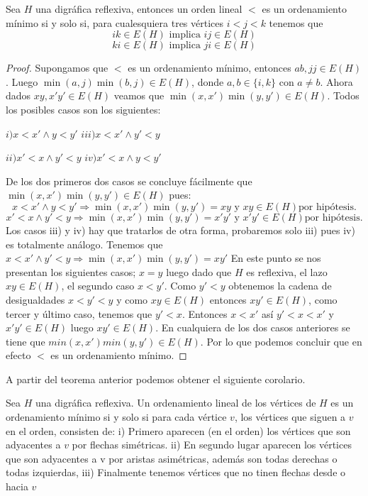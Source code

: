 \begin{teorema}
\label{teo:OrdLnl}
    Sea $H$ una digráfica reflexiva, entonces un orden lineal $<$ es un ordenamiento m\'inimo si y solo si, para cualesquiera tres vértices $i<j<k$ tenemos que 
    $$ik\in E(H) \text{ implica } ij\in E(H)$$
    $$ki\in E(H) \text{ implica } ji\in E(H)$$
\end{teorema}
\begin{proof}
    Supongamos que $<$ es un ordenamiento m\'inimo, entonces $ab,jj\in E(H)$. Luego $\min(a,j) \min(b,j)\in E(H)$, donde $a,b \in \{ i,k\}$ con $a \neq b$.
    Ahora dados $xy, x'y' \in E(H)$ veamos que $\min(x,x') \min(y,y')\in E(H)$. Todos los posibles casos son los siguientes:
    
    $ i) x<x' \wedge y<y' $ \hspace{1cm} $iii) x<x' \wedge y'<y $
    
    $ ii) x'<x \wedge y'<y $ \hspace{1cm} $iv) x'<x \wedge y<y' $

    De los dos primeros dos casos se concluye fácilmente que $\min(x,x') \min(y,y')\in E(H)$ pues:
    $$x<x' \wedge y<y' \Rightarrow \min(x,x') \min(y,y')=xy \text{ y } xy\in E(H) \text{por hipótesis.}$$
    $$x'<x \wedge y'<y \Rightarrow \min(x,x') \min(y,y')=x'y' \text{ y } x'y'\in E(H) \text{por hipótesis.}$$
    Los casos iii) y iv) hay que tratarlos de otra forma, probaremos solo iii) pues iv) es totalmente análogo.
    Tenemos que $x<x' \wedge y'<y\Rightarrow \min(x,x') \min(y,y')=xy' $ En este punto se nos presentan los siguientes casos; $x=y$ luego dado que $H$ es reflexiva, el lazo $xy\in E(H)$, el segundo caso $x<y' $. Como $y'<y$ obtenemos la cadena de desigualdades $x<y'<y$ y como $xy\in E(H)$ entonces $xy'\in E(H)$, como tercer y último caso, tenemos que $y'<x$. Entonces $x<x'$ así $y'<x<x'$ y $x'y'\in E(H)$ luego $xy'\in E(H)$. En cualquiera de los dos casos anteriores se tiene que $min(x,x')min(y,y')\in E(H)$. Por lo que podemos concluir que en efecto $<$ es un ordenamiento mínimo.
\end{proof}

A partir del teorema anterior podemos obtener el siguiente corolario.
\begin{corolario}
    Sea $H$ una digráfica reflexiva. Un ordenamiento lineal de los vértices de $H$ es un ordenamiento mínimo si y solo si para cada vértice $v$, los vértices que siguen a $v$ en el orden, consisten de: i) Primero aparecen (en el orden) los vértices que son adyacentes a $v$ por flechas simétricas. ii) En segundo lugar aparecen los vértices que son adyacentes a v por aristas asimétricas, además son todas derechas o todas izquierdas, iii) Finalmente tenemos vértices que no tinen flechas desde o hacia $v$
\end{corolario}

